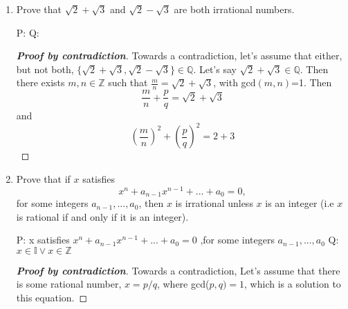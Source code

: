 \documentclass{article} %
\theoremstyle{plain}
\theoremstyle{definition}
\theoremstyle{case}
\newtheorem{case}{Case}
\begin{document}
\begin{enumerate}[label={\fbox{\textbf{Exercise \#\arabic* :}}}]
\begin{proof}[\textbf{Proof By Contrapositive}]
\begin{case}
      If $n=3k+2$, then
      \[ n^2 = 9k^2 + 12k + 4 = 3(3k^2 + 4k + 1) + 1 \]
      But this too is not divisble by 3.
    \end{case}

\end{proof}

\renewcommand\qedsymbol{\Lightning}
\begin{proof}[\textbf{Proof by contradiction}]  Towards a contradiction,
  let's assume that \[ 3 \not| n^2 \]

  We also know that $3 | n$, so there is some integer, $k$ such that
  $n = 3m$. Multiplying both sides by $3m$
  we get $n^2 = 3^2m^2 = 3(3m^3)$, which is surely divisble by 3.  But
  we said that  $ 3 \not| n^2 $!

\end{proof} 
\renewcommand\qedsymbol{$\square$}

\newpage
\item Prove that $\sqrt{2}+\sqrt{3}$ and $\sqrt{2}-\sqrt{3}$ are both
  irrational numbers.

P: 
Q:

\renewcommand\qedsymbol{\Lightning}
\begin{proof}[\textbf{Proof by contradiction}]  Towards a contradiction,
  let's assume that either, but not both, $\{\sqrt{2}+\sqrt{3},
  \sqrt{2}-\sqrt{3} \} \in \mathbb{Q}$.  Let's say $\sqrt{2}+\sqrt{3} 
  \in \mathbb{Q} $.
  Then there exists $m,n \in \mathbb{Z} $ such that $\frac{m}{n}
  = \sqrt{2} + \sqrt{3}$, with gcd$(m,n)$=1.
  Then 
  \[ \frac{m}{n} + \frac{p}{q} = \sqrt{2}+\sqrt{3} \]
  and
  \[ \left( \frac{m}{n} \right)^2 + \left( \frac{p}{q} \right)^2 = 2+3 \]
\end{proof} 
\renewcommand\qedsymbol{$\square$}
\newpage
\item Prove that if $x$ satisfies 
  \[ x^n+a_{n-1}x^{n-1}+...+a_{0}=0, \]
  for some integers $a_{n-1},...,a_0$, then $x$ is irrational unless $x$ is an integer (i.e $x$ is rational if and only if it is an integer).

P: x satisfies $x^n+a_{n-1}x^{n-1}+...+a_{0}=0$ ,for some integers $a_{n-1},...,a_0$
Q: $x \in \mathbb{I} \vee x \in \mathbb{Z} $

  \renewcommand\qedsymbol{\Lightning}
  \begin{proof}[\textbf{Proof by contradiction}]  Towards a contradiction,
    Let's assume that there is some rational number, $x = p/q$, where
    gcd($p,q) = 1$, which is a solution to this equation.


\end{proof}
\end{enumerate}
\end{document}

